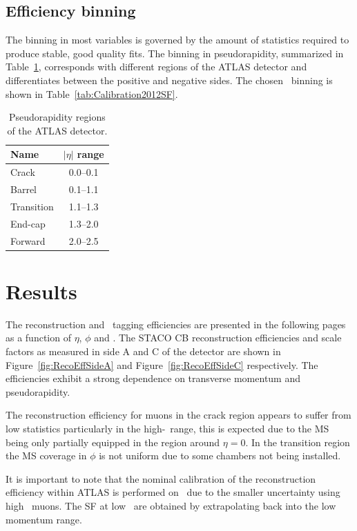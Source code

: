 \subsection{Efficiency binning}
The binning in most variables is governed by the amount of statistics required to produce stable, good quality fits. The binning in pseudorapidity, summarized in Table~\ref{tab:CalibrationEtaRegions}, corresponds with different regions of the ATLAS detector and differentiates between the positive and negative sides. The chosen \pt\ binning is shown in Table~\ref{tab:Calibration2012SF}.

\begin{table}[thbp]
  \centering
  \begin{tabular}{@{}lc@{}}
    \toprule
    Name       & $|\eta|$ range \\
    \midrule
    Crack      & \numrange{0.0}{0.1} \\
    Barrel     & \numrange{0.1}{1.1} \\
    Transition & \numrange{1.1}{1.3} \\
    End-cap    & \numrange{1.3}{2.0} \\
    Forward    & \numrange{2.0}{2.5} \\
    \bottomrule
  \end{tabular}
  \caption{Pseudorapidity regions of the ATLAS detector.}\label{tab:CalibrationEtaRegions}
\end{table}

\section{Results}

The reconstruction and \xsm\ tagging efficiencies are presented in the following pages as a function of $\eta$, $\phi$ and \pt. The STACO CB reconstruction efficiencies and scale factors as measured in side A and C of the detector are shown in Figure~\ref{fig:RecoEffSideA} and Figure~\ref{fig:RecoEffSideC} respectively. The efficiencies exhibit a strong dependence on transverse momentum and pseudorapidity.

The reconstruction efficiency for muons in the crack region appears to suffer from low statistics particularly in the high-\pt\ range, this is expected due to the MS being only partially equipped in the region around $\eta=0$. In the transition region the MS coverage in $\phi$ is not uniform due to some chambers not being installed.

It is important to note that the nominal calibration of the reconstruction efficiency within ATLAS is performed on \ZMu\ due to the smaller uncertainty using high \pt\ muons. The SF at low \pt\ are obtained by extrapolating back into the low momentum range.

